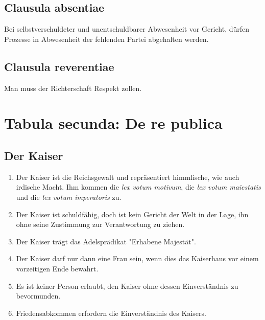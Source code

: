 \documentclass{article}
\begin{document}
\subsection{Clausula absentiae}
Bei selbstverschuldeter und unentschuldbarer Abwesenheit vor Gericht, dürfen Prozesse in Abwesenheit der fehlenden Partei abgehalten werden.

\subsection{Clausula reverentiae}
Man muss der Richterschaft Respekt zollen.

\section{Tabula secunda: De re publica}
\subsection{Der Kaiser}
\begin{enumerate}[(1)]
    \item Der Kaiser ist die Reichsgewalt und repräsentiert himmlische, wie auch irdische Macht. Ihm kommen die \textit{lex votum motivum}, die \textit{lex votum maiestatis} und die \textit{lex votum imperatoris} zu.
    \item Der Kaiser ist schuldfähig, doch ist kein Gericht der Welt in der Lage, ihn ohne seine Zustimmung zur Verantwortung zu ziehen.
    \item Der Kaiser trägt das Adelsprädikat "Erhabene Majestät".
    \item Der Kaiser darf nur dann eine Frau sein, wenn dies das Kaiserhaus vor einem vorzeitigen Ende bewahrt.
    \item Es ist keiner Person erlaubt, den Kaiser ohne dessen Einverständnis zu bevormunden.
    \item Friedensabkommen erfordern die Einverständnis des Kaisers.
\end{enumerate}
\end{document}
